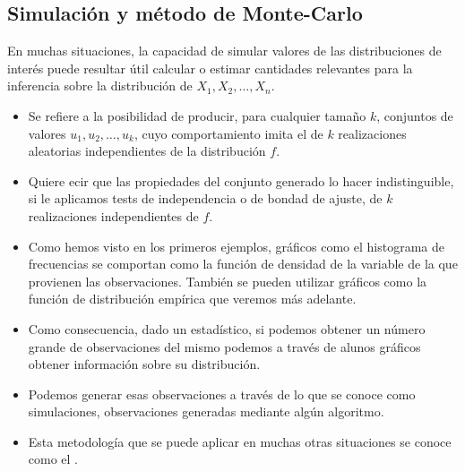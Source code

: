 \subsection{Simulación y método de Monte-Carlo}
\begin{tcolorbox}[colback=blue!5!white, colframe=blue!75!black, title=\textbf{Motivación}]
En muchas situaciones, la capacidad de simular valores de las distribuciones de interés puede resultar útil calcular o estimar cantidades relevantes para la inferencia sobre la distribución de $X_1,X_2,\dots,X_n$.
\end{tcolorbox}
\begin{tcolorbox}[colback=blue!5!white, colframe=blue!75!black, title=\textbf{¿Qué es ser capaz de simular valores de una distribución $f$?}]
\begin{itemize}[label=\textbullet]
    \item Se refiere a la posibilidad de producir, para cualquier tamaño $k$, conjuntos de valores $u_1,u_2,\dots,u_k$, cuyo comportamiento imita el de $k$ realizaciones aleatorias independientes de la distribución $f$.
    \item Quiere ecir que las propiedades del conjunto generado lo hacer indistinguible, si le aplicamos tests de independencia o de bondad de ajuste, de  $k$ realizaciones independientes de $f$.
\end{itemize}
\end{tcolorbox}
\begin{tcolorbox}[colback=blue!5!white, colframe=blue!75!black, title=\textbf{Simulación y método de Monte-Carlo}]
\begin{itemize}[label=\textbullet]
    \item Como hemos visto en los primeros ejemplos, gráficos como el histograma de frecuencias se comportan como la función de densidad de la variable de la que provienen las observaciones. También se pueden utilizar gráficos como la función de distribución empírica que veremos más adelante.
    \item Como consecuencia, dado un estadístico, si podemos obtener un número grande de observaciones del mismo podemos a través de alunos gráficos obtener información sobre su distribución.
    \item Podemos generar esas observaciones a través de lo que se conoce como simulaciones, observaciones generadas mediante algún algoritmo.
    \item Esta metodología que se puede aplicar en muchas otras situaciones se conoce como el . 
\end{itemize}
\end{tcolorbox}

